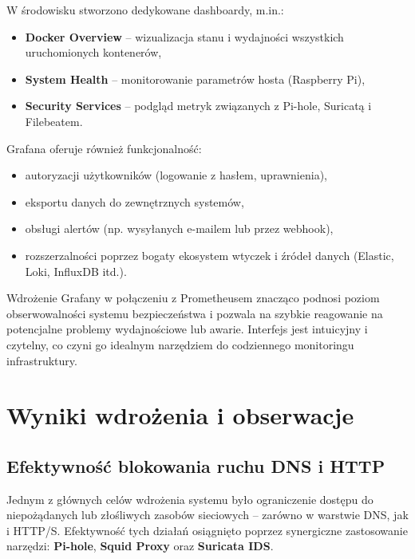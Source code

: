 \documentclass[
    left=2.5cm,         %
    right=2.5cm,        %
    top=2.5cm,          %
    bottom=3cm,         %
    bindingoffset=6mm,  %
    nohyphenation=true %
]{eiti/eiti-thesis} %
\begin{document}
W środowisku stworzono dedykowane dashboardy, m.in.:
\begin{itemize}
    \item \textbf{Docker Overview} – wizualizacja stanu i wydajności wszystkich uruchomionych kontenerów,
    \item \textbf{System Health} – monitorowanie parametrów hosta (Raspberry Pi),
    \item \textbf{Security Services} – podgląd metryk związanych z Pi-hole, Suricatą i Filebeatem.
\end{itemize}

Grafana oferuje również funkcjonalność:
\begin{itemize}
    \item autoryzacji użytkowników (logowanie z hasłem, uprawnienia),
    \item eksportu danych do zewnętrznych systemów,
    \item obsługi alertów (np. wysyłanych e-mailem lub przez webhook),
    \item rozszerzalności poprzez bogaty ekosystem wtyczek i źródeł danych (Elastic, Loki, InfluxDB itd.).
\end{itemize}

Wdrożenie Grafany w połączeniu z Prometheusem znacząco podnosi poziom obserwowalności systemu bezpieczeństwa i pozwala na szybkie reagowanie na potencjalne problemy wydajnościowe lub awarie. Interfejs jest intuicyjny i czytelny, co czyni go idealnym narzędziem do codziennego monitoringu infrastruktury.

\section{ Wyniki wdrożenia i obserwacje}
\subsection{Efektywność blokowania ruchu DNS i HTTP}

Jednym z głównych celów wdrożenia systemu było ograniczenie dostępu do niepożądanych lub złośliwych zasobów sieciowych – zarówno w warstwie DNS, jak i HTTP/S. Efektywność tych działań osiągnięto poprzez synergiczne zastosowanie narzędzi: \textbf{Pi-hole}, \textbf{Squid Proxy} oraz \textbf{Suricata IDS}.
\end{document}
